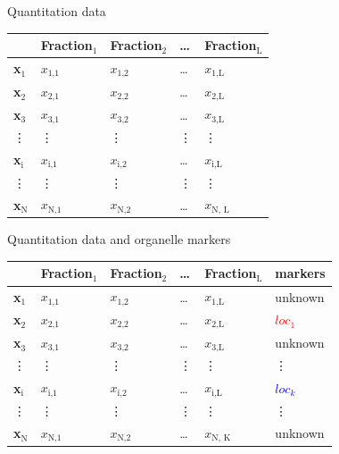 \documentclass{beamer}
\theoremstyle{example}
\begin{document}
\begin{frame}{Quantitation data}
  \begin{center}
    \begin{tabular}{|l|llll|}
      \hline
      & Fraction$_{\text{1}}$ & Fraction$_{\text{2}}$ & \ldots{} & Fraction$_{\text{L}}$ \\
      \hline
      {\bf x}$_{\text{1}}$ & $x_{\text{1,1}}$ & $x_{\text{1,2}}$ & \ldots{} & $x_{\text{1,L}}$ \\
      {\bf x}$_{\text{2}}$ & $x_{\text{2,1}}$ & $x_{\text{2,2}}$ & \ldots{} & $x_{\text{2,L}}$ \\
      {\bf x}$_{\text{3}}$ & $x_{\text{3,1}}$ & $x_{\text{3,2}}$ & \ldots{} & $x_{\text{3,L}}$ \\
      \vdots & \vdots & \vdots & \vdots & \vdots \\
      {\bf x}$_{\text{i}}$ & $x_{\text{i,1}}$ & $x_{\text{i,2}}$ & \ldots{} & $x_{\text{i,L}}$ \\
      \vdots & \vdots & \vdots & \vdots & \vdots \\
      {\bf x}$_{\text{N}}$ & $x_{\text{N,1}}$ & $x_{\text{N,2}}$ & \ldots{} & $x_{\text{N, L}}$ \\
      \hline
    \end{tabular}
  \end{center}
\end{frame}

\begin{frame}{Quantitation data and organelle markers}
  \begin{center}
    \begin{tabular}{|l|llll||l|}
      \hline
      & Fraction$_{\text{1}}$ & Fraction$_{\text{2}}$ & \ldots{} & Fraction$_{\text{L}}$ & markers\\
      \hline
      {\bf x}$_{\text{1}}$ & $x_{\text{1,1}}$ & $x_{\text{1,2}}$ & \ldots{} & $x_{\text{1,L}}$ & unknown \\
      {\bf x}$_{\text{2}}$ & $x_{\text{2,1}}$ & $x_{\text{2,2}}$ & \ldots{} & $x_{\text{2,L}}$ & \textcolor{Red}{$loc_{1}$}\\
      {\bf x}$_{\text{3}}$ & $x_{\text{3,1}}$ & $x_{\text{3,2}}$ & \ldots{} & $x_{\text{3,L}}$ & unknown \\
      \vdots & \vdots & \vdots & \vdots & \vdots & \vdots \\
      {\bf x}$_{\text{i}}$ & $x_{\text{i,1}}$ & $x_{\text{i,2}}$ & \ldots{} & $x_{\text{i,L}}$ & \textcolor{Blue}{$loc_{k}$}\\
      \vdots & \vdots & \vdots & \vdots & \vdots & \vdots\\
      {\bf x}$_{\text{N}}$ & $x_{\text{N,1}}$ & $x_{\text{N,2}}$ & \ldots{} & $x_{\text{N, K}}$ & unknown \\
      \hline
    \end{tabular}
  \end{center}
\end{frame}
\end{document}

